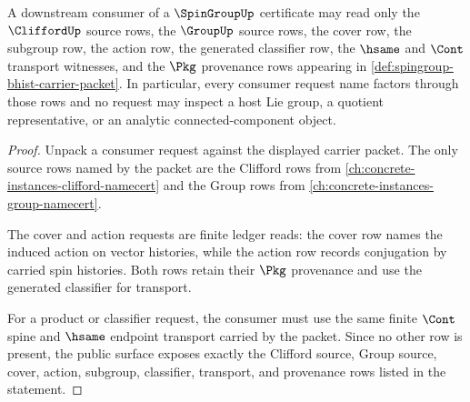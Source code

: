 \begin{theorem}
\label{thm:spingroup-clifford-group-consumer-boundary}
A downstream consumer of a $\SpinGroupUp$ certificate may read only the
$\CliffordUp$ source rows, the $\GroupUp$ source rows, the cover row, the
subgroup row, the action row, the generated classifier row, the $\hsame$ and
$\Cont$ transport witnesses, and the $\Pkg$ provenance rows appearing in
\autoref{def:spingroup-bhist-carrier-packet}. In particular, every consumer
request name factors through those rows and no request may inspect a host Lie
group, a quotient representative, or an analytic connected-component object.
\end{theorem}
\begin{proof}
Unpack a consumer request against the displayed carrier packet. The only
source rows named by the packet are the Clifford rows from
\autoref{ch:concrete-instances-clifford-namecert} and the Group rows from
\autoref{ch:concrete-instances-group-namecert}.

The cover and action requests are finite ledger reads: the cover row names
the induced action on vector histories, while the action row records
conjugation by carried spin histories. Both rows retain their $\Pkg$
provenance and use the generated classifier for transport.

For a product or classifier request, the consumer must use the same finite
$\Cont$ spine and $\hsame$ endpoint transport carried by the packet. Since no
other row is present, the public surface exposes exactly the Clifford source,
Group source, cover, action, subgroup, classifier, transport, and provenance
rows listed in the statement.
\end{proof}
